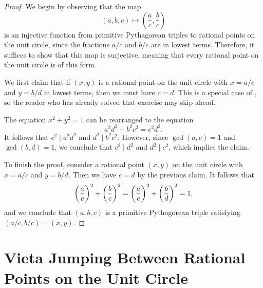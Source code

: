 \begin{proof}
  We begin by observing that the map
  \begin{equation*}
    (a,b,c)\mapsto \left(\frac{a}{c},\frac{b}{c}\right)
  \end{equation*}
  is an injective function from primitive Pythagorean triples to rational points on the unit circle, since the fractions $a/c$ and $b/c$ are in lowest terms. Therefore, it suffices to show that this map is surjective, meaning that every rational point on the unit circle is of this form.

  We first claim that if $(x,y)$ is a rational point on the unit circle with $x=a/c$ and $y= b/d$ in lowest terms, then we must have $c=d$. This is a special case of , so the reader who has already solved that exercise may skip ahead.

  The equation $x^2+y^2=1$ can be rearranged to the equation
  \begin{equation*}
    a^2d^2+b^2c^2=c^2d^2.
  \end{equation*}
  It follows that $c^2\mid a^2d^2$ and $d^2\mid b^2c^2$. However, since $\gcd(a,c)=1$ and $\gcd(b,d)=1$, we conclude that $c^2\mid d^2$ and $d^2\mid c^2$, which implies the claim.

  To finish the proof, consider a rational point $(x,y)$ on the unit circle with $x=a/c$ and $y=b/d$. Then we have $c=d$ by the previous claim. It follows that
  \begin{equation*}
    \left(\frac{a\vphantom{b}}{c\vphantom{d}}\right)^2+\left(\frac{b}{c\vphantom{d}}\right)^2=\left(\frac{a\vphantom{b}}{c\vphantom{d}}\right)^2+\left(\frac{b}{d\vphantom{c}}\right)^2=1,
  \end{equation*}
  and we conclude that $(a,b,c)$ is a primitive Pythagorean triple satisfying $(a/c,b/c)=(x,y)$.
\end{proof}

\section[Vieta Jumping]{Vieta Jumping Between Rational Points on the Unit Circle}\label{section:vieta-jumping}

